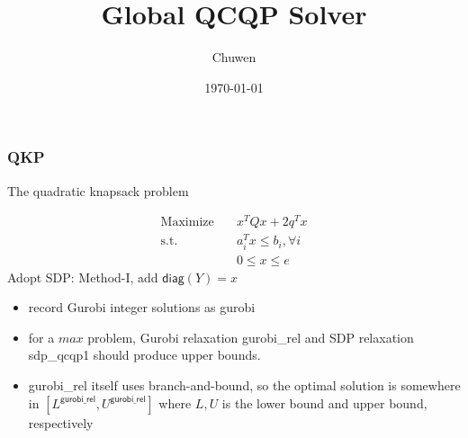 
\usepackage{subfig}
\usepackage[style=verbose]{biblatex}
\title{Global QCQP Solver}
\author{Chuwen}
\date{\today}




\fontsize{10pt}{11.2}\selectfont
\frame{\titlepage}


\begin{frame}
  \frametitle{ QKP}
  The quadratic knapsack problem

  \begin{equation}
    \begin{aligned}
      \mathrm{Maximize}\quad & x^TQx   + 2q^T x           \\
      \mathrm{s.t.}  \quad   & a_i^Tx \le  b_i, \forall i \\
                             & 0\le x\le e
    \end{aligned}
  \end{equation}
  Adopt SDP: Method-I, add \(\mathsf{diag}(Y) = x\)

\end{frame}

\begin{frame}
  \begin{itemize}
    \item record Gurobi integer solutions as \textsf{gurobi}
    \item for a \(max\) problem, Gurobi relaxation \textsf{gurobi\_rel}
          and SDP relaxation \textsf{sdp\_qcqp1} should produce upper bounds.
    \item \textsf{gurobi\_rel} itself uses branch-and-bound, so the optimal solution is somewhere in \([L^{\mathsf{gurobi\_rel}}, U^{\mathsf{gurobi\_rel}}]\) where \(L, U\) is the lower bound and upper bound, respectively
  \end{itemize}

\end{frame}



